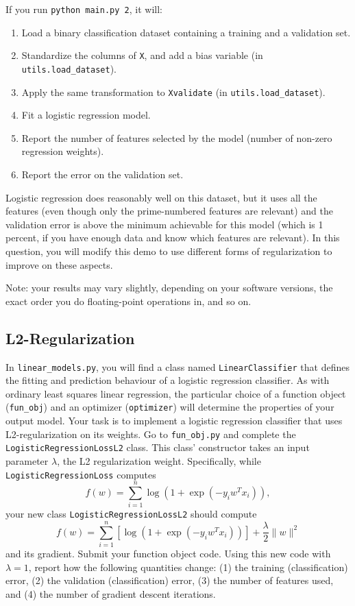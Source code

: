 \documentclass{article}
\def\blu#1{{\color{blu}#1}}
\def\norm#1{\|#1\|}
\let\ask\blu
\begin{document}
If you run  \verb|python main.py 2|, it will:
\begin{enumerate}
\item Load a binary classification dataset containing a training and a validation set.
\item Standardize the columns of \verb|X|, and add a bias variable (in \verb|utils.load_dataset|).
\item Apply the same transformation to \verb|Xvalidate| (in \verb|utils.load_dataset|).
\item Fit a logistic regression model.
\item Report the number of features selected by the model (number of non-zero regression weights).
\item Report the error on the validation set.
\end{enumerate}
Logistic regression does reasonably well on this dataset,
but it uses all the features (even though only the prime-numbered features are relevant)
and the validation error is above the minimum achievable for this model
(which is 1 percent, if you have enough data and know which features are relevant).
In this question, you will modify this demo to use different forms of regularization
 to improve on these aspects.

Note: your results may vary slightly, depending on your software versions, the exact order you do floating-point operations in, and so on.


\subsection{L2-Regularization }

In \verb|linear_models.py|, you will find a class named \verb|LinearClassifier| that defines the fitting and prediction behaviour of a logistic regression classifier. As with ordinary least squares linear regression, the particular choice of a function object (\verb|fun_obj|) and an optimizer (\verb|optimizer|) will determine the properties of your output model.
Your task is to implement a logistic regression classifier that uses L2-regularization on its weights. Go to \verb|fun_obj.py| and complete the \verb|LogisticRegressionLossL2| class. This class' constructor takes an input parameter $\lambda$, the L2 regularization weight. Specifically, while \verb|LogisticRegressionLoss| computes
\[
f(w) = \sum_{i=1}^n \log(1+\exp(-y_iw^Tx_i)),
\]
your new class \verb|LogisticRegressionLossL2| should compute
\[
f(w) = \sum_{i=1}^n \left[\log(1+\exp(-y_iw^Tx_i))\right] + \frac{\lambda}{2}\norm{w}^2
\]
and its gradient.
\ask{Submit your function object code. Using this new code with $\lambda = 1$, report how the following quantities change: (1) the training (classification) error, (2) the validation (classification) error, (3) the number of features used, and (4) the number of gradient descent iterations.}
\end{document}
